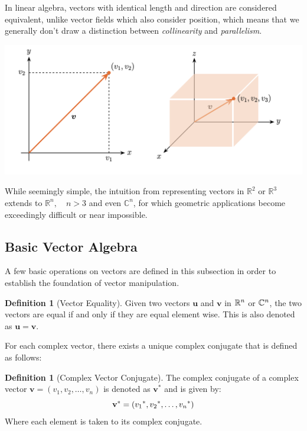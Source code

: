 \documentclass[12pt]{article}
\theoremstyle{definition}
\newtheorem{definition}[theorem]{Definition}
\begin{document}
In linear algebra, vectors with identical length and direction are considered equivalent, unlike vector fields which also consider position, which means that we generally don't draw a distinction between \emph{collinearity} and \emph{parallelism}.

\includegraphics[width=\textwidth]{5_vec0}

While seemingly simple, the intuition from representing vectors in $\mathbb{R}^2$ or $\mathbb{R}^3$ extends to $\mathbb{R}^n, \quad n > 3$ and even $\mathbb{C}^n$, for which geometric applications become exceedingly difficult or near impossible. 



\subsection{Basic Vector Algebra}

A few basic operations on vectors are defined in this subsection in order to establish the foundation of vector manipulation.

\begin{definition}[Vector Equality]
    Given two vectors $\mathbf{u}$ and $\mathbf{v}$ in $\mathbb{R}^n$ or $\mathbb{C}^n$, the two vectors are equal if and only if they are equal element wise. This is also denoted as $\mathbf{u} = \mathbf{v}$.
\end{definition}

For each complex vector, there exists a unique complex conjugate that is defined as follows:

\begin{definition}[Complex Vector Conjugate]
    The complex conjugate of a complex vector $\mathbf{v} = (v_1, v_2, \ldots, v_n)$ is denoted as $\mathbf{v}^*$ and is given by: 
    $$\mathbf{v}^* = ({v_1}^*, {v_2}^*, \ldots, {v_n}^*)$$
    Where each element is taken to its complex conjugate.
\end{definition}
\end{document}
